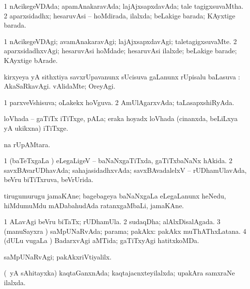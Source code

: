 \bentry
{}
\gl{\gu}
\bmng
\bnum
\num{1} nAcikegeVDAda; apamAnakaravAda; lajAjxsapxdavAda; tale tagigxsuvaMtha. 
\num{2} aparxsidadhx; hesaruvAsi -- hoMdirada, ilalxda; beLakige barada; KAyxtige barada. 
\enum
\emng
\eentry

\bentry
{}
\gl{\kirxvi}
\bmng
\bnum
\num{1} nAcikegeVDAgi; avamAnakaravAgi; lajAjxsapxdavAgi; taletagigxsuvaMte. 
\num{2} aparxsidadhxvAgi; hesaruvAsi hoMdade; hesaruvAsi ilalxde; beLakige barade; KAyxtige bArade. 
\enum
\emng
\eentry

\bentry
{}
\gl{\uparx}
\bmng
kirxyeya yA sithxtiya savxrUpavanunx sUcisuva \kirxvi gaLanunx rUpisalu baLasuva \uparx:  AkaSaRkavAgi.  vAlidaMte; OreyAgi. 
\emng
\eentry

\bentry
{}
\gl{\gu}
\bmng
\bnum
\num{1} parxveVshisuva; oLakekx hoVguva. 
\num{2} AmUlAgarxvAda; taLasapxshiRyAda. 
\enum
\emng
\eentry

\bentry
{}
\gl{\nA}
\bmng
loVhada -- gaTiTx iTiTxge, pALa; eraka hoyadx loVhada (\sA cinanxda, beLiLxya yA ukikxna) iTiTxge. 
\emng
\eentry

\bentry
{}
\gl{\sakirx}
\bmng
{}na rUpAMtara. 
\emng
\eentry

\bentry
{}
\gl{\gu}
\bmng
\bnum
\num{1} (baTeTxgaLa \vi) eLegaLigeV -- baNaNxgaTiTxda, gaTiTxbaNaNx hAkida. 
\num{2} savxBAvarUDhavAda; sahajasidadhxvAda; savxBAvadalelxV -- rUDhamUlavAda, beVru biTiTxruva, beVrUrida. 
\enum
\emng
\eentry

\bentry
{}
\gl{\nA}
\bmng
tirugumurugu jamaKAne; bagebageya baNaNxgaLa eLegaLanunx heNedu, hiMdumuMdu mADabahudAda ratanxgaMbaLi, jamaKAne. 
\emng
\eentry

\bentry
{}
\gl{\gu}
\bmng
\bnum
\num{1} ALavAgi beVru biTaTx; rUDhamUla. 
\num{2} sudaqDha; alAlxDisalAgada. 
\num{3} (manuSayxra \vi) saMpUNaRvAda; parama; pakAkx:  pakAkx muThAThxLatana. 
\num{4} (dULu \mo vugaLa \vi) BadarxvAgi aMTida; gaTiTxyAgi hatitxkoMDa. 
\enum
\emng
\eentry

\bentry
{}
\gl{\kirxvi}
\bmng
saMpUNaRvAgi; pakAkxriVtiyalilx. 
\emng
\eentry

\bentry
{}
\gl{\gu}
\bmng
(\aupa\ yA sAhitayxka) kaqtaGanxnAda; kaqtajacnxteyilalxda; upakAra samxraNe ilalxda. 
\emng
\eentry

